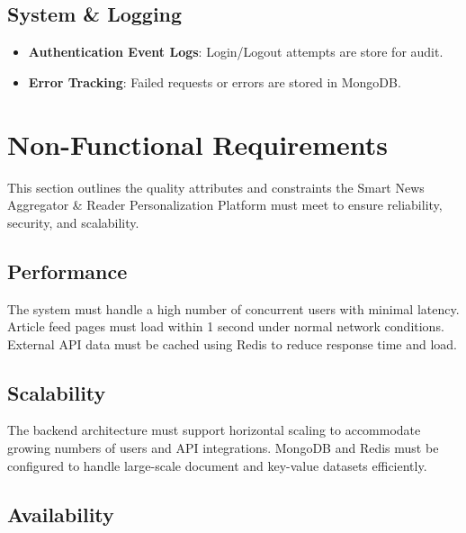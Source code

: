 \subsection{System \& Logging}\label{subsec:system-logging}

\begin{itemize}
    \item \textbf{Authentication Event Logs}: Login/Logout attempts are store for audit.
    \item \textbf{Error Tracking}: Failed requests or errors are stored in MongoDB.
\end{itemize}


\section{Non-Functional Requirements}\label{sec:non-functional-requirements}

This section outlines the quality attributes and constraints the Smart News Aggregator \& Reader Personalization Platform must meet to ensure reliability, security, and scalability.

\subsection{Performance}\label{subsec:performance}

The system must handle a high number of concurrent users with minimal latency.
Article feed pages must load within 1 second under normal network conditions.
External API data must be cached using Redis to reduce response time and load.


\subsection{Scalability}\label{subsec:scalability}

The backend architecture must support horizontal scaling to accommodate growing numbers of users and API integrations.
MongoDB and Redis must be configured to handle large-scale document and key-value datasets efficiently.

\subsection{Availability}\label{subsec:availability}

